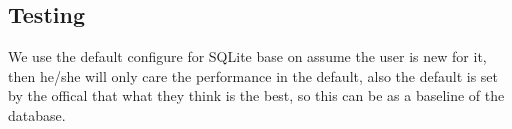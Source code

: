 






\subsection{Testing}

We use the default configure for SQLite base on assume the user is new for it, then he/she will only care the performance in the default, also the default is set by the offical that what they think is the best, so this can be as a baseline of the database.\\




\clearpage

